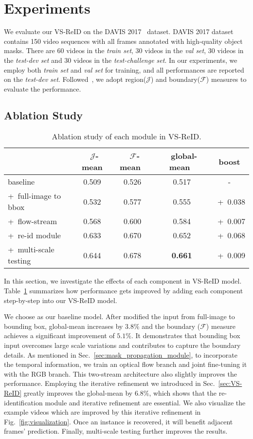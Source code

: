 \section{Experiments}
%
We evaluate our VS-ReID on the DAVIS 2017~\cite{Pont-Tuset_arXiv_2017} dataset.
%
DAVIS 2017 dataset contains 150 video sequences with all frames annotated with high-quality object masks.
%
There are 60 videos in the \emph{train set}, 30 videos in the \emph{val set}, 30 videos in the \emph{test-dev set} and 30 videos in the \emph{test-challenge set}.
%
In our experiments, we employ both \emph{train set} and \emph{val set} for training, and all performances are reported on the \emph{test-dev set}.
%
Followed~\cite{Perazzi2016}, we adopt region($\mathcal{J}$) and boundary($\mathcal{F}$) measures to evaluate the performance. 

\subsection{Ablation Study}
\begin{table}[t]
	\small
	\caption{Ablation study of each module in VS-ReID.}
	\centering
	\begin{tabular}{@{}l@{\,}|@{}c@{\,}|@{}c@{\,}|@{}c@{\,}|@{}c@{\,}}
		\hline
		&~$\mathcal{J}$-mean&~$\mathcal{F}$-mean~&~global-mean~&~boost~\\
		\hline\hline
		baseline\cite{Perazzi2017}~&0.509&0.526&0.517&-\\
		+~full-image to bbox~&0.532&0.577&0.555&~+~0.038\\
		+~flow-stream~&0.568&0.600&0.584&~+~0.007\\
		+~re-id module~&0.633&0.670&0.652&~+~0.068\\
		+~multi-scale testing~&0.644&0.678&\textbf{0.661}&~+~0.009\\
		\hline
	\end{tabular}
	\label{tab:ablation}
\end{table}
In this section, we investigate the effects of each component in VS-ReID model. 
%
Table~\ref{tab:ablation} summarizes how performance gets improved by adding each component step-by-step into our VS-ReID model.

We choose \cite{Perazzi2017} as our baseline model. 
%
After modified the input from full-image to bounding box, global-mean increases by $3.8\%$ and the boundary ($\mathcal{F}$) measure achieves a significant improvement of $5.1\%$.
%
It demonstrates that bounding box input overcomes large scale variations and contributes to capture the boundary details.
%
As mentioned in Sec.~\ref{sec:mask_propagation_module}, to incorporate the temporal information, we train an optical flow branch and joint fine-tuning it with the RGB branch.
%
This two-stream architecture also slightly improves the performance.
%
Employing the iterative refinement we introduced in Sec.~\ref{sec:VS-ReID} greatly improves the global-mean by $6.8\%$, which shows that the re-identification module and iterative refinement are essential.
%
We also visualize the example videos which are improved by this iterative refinement in Fig.~\ref{fig:visualization}.
%
Once an instance is recovered, it will benefit adjacent frames' prediction.
%
Finally, multi-scale testing further improves the results.

